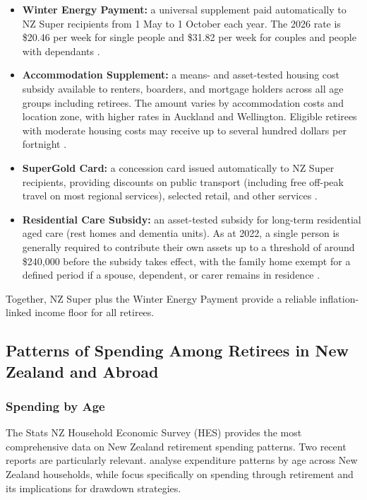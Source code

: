 \documentclass[11pt]{article}
\begin{document}
\begin{itemize}
  \item \textbf{Winter Energy Payment:} a universal supplement paid automatically to NZ Super recipients from 1 May to 1 October each year. The 2026 rate is \$20.46 per week for single people and \$31.82 per week for couples and people with dependants \parencite{winz2026benefitRates}.
  \item \textbf{Accommodation Supplement:} a means- and asset-tested housing cost subsidy available to renters, boarders, and mortgage holders across all age groups including retirees. The amount varies by accommodation costs and location zone, with higher rates in Auckland and Wellington. Eligible retirees with moderate housing costs may receive up to several hundred dollars per fortnight \parencite{winz2026benefitRates}.
  \item \textbf{SuperGold Card:} a concession card issued automatically to NZ Super recipients, providing discounts on public transport (including free off-peak travel on most regional services), selected retail, and other services \parencite{msd2022retirementPolicies}.
  \item \textbf{Residential Care Subsidy:} an asset-tested subsidy for long-term residential aged care (rest homes and dementia units). As at 2022, a single person is generally required to contribute their own assets up to a threshold of around \$240,000 before the subsidy takes effect, with the family home exempt for a defined period if a spouse, dependent, or carer remains in residence \parencite{msd2022retirementPolicies}.
\end{itemize}

Together, NZ Super plus the Winter Energy Payment provide a reliable inflation-linked income floor for all retirees.

\subsection{Patterns of Spending Among Retirees in New Zealand and Abroad}
\subsubsection{Spending by Age}

The Stats NZ Household Economic Survey (HES) provides the most comprehensive data on New Zealand retirement spending patterns. Two recent reports are particularly relevant. \textcite{le2023expenditure} analyse expenditure patterns by age across New Zealand households, while \textcite{riig2024spending} focus specifically on spending through retirement and its implications for drawdown strategies.
\end{document}
